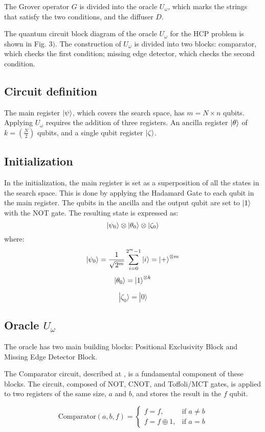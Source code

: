 \documentclass{article}
\begin{document}
The Grover operator $G$ is divided into the oracle $U_\omega$, which marks the strings that satisfy the two conditions, and the diffuser $D$.

The quantum circuit block diagram of the oracle $U_\omega$ for the HCP problem is shown in Fig. $3)$. The construction of $U_\omega$ is divided into two blocks: comparator, which checks the first condition; missing edge detector, which checks the second condition.

\subsection{Circuit definition}
The main register $\ket{\psi}$, which covers the search space, has $m = N \times n$ qubits. Applying $U_\omega$ requires the addition of three registers. An ancilla register $\ket{\theta}$ of $k = \left(\frac{N}{2}\right)$ qubits, and a single qubit register $\ket{\zeta}$.

\subsection{Initialization}
In the initialization, the main register is set as a superposition of all the states in the search space. This is done by applying the Hadamard Gate to each qubit in the main register. The qubits in the ancilla and the output qubit are set to $\ket{1}$ with the NOT gate. The resulting state is expressed as:
$$\ket{\psi_0} \otimes \ket{\theta_0} \otimes \ket{\zeta_0}$$
where:
$$\ket{\psi_0} = \frac{1}{\sqrt{2^m}} \sum_{i=0}^{2^m-1} \ket{i} = \ket{+}^{\otimes m}$$
$$\ket{\theta_0} = \ket{1}^{\otimes k}$$

$$|\zeta_0\rangle = |0\rangle$$

\subsection{Oracle \(U_\omega\)}
The oracle has two main building blocks: Positional Exclusivity Block and Missing Edge Detector Block.

The Comparator circuit, described at \cite{reference}, is a fundamental component of these blocks. The circuit, composed of NOT, CNOT, and Toffoli/MCT gates, is applied to two registers of the same size, \(a\) and \(b\), and stores the result in the \(f\) qubit.

\[
\text{Comparator}(a, b, f) =
\begin{cases}
    f = f, & \text{if } a \neq b \\
    f = f \oplus 1, & \text{if } a = b
\end{cases}
\]
\end{document}
